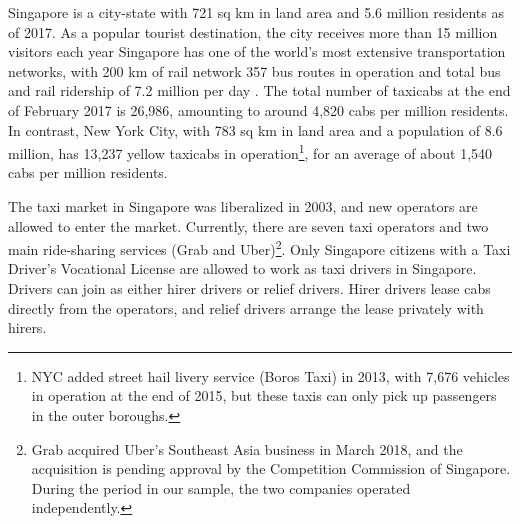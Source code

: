 \documentclass[reviewmode]{AEA}
\begin{document}
Singapore is a city-state with 721 sq km in land area and 5.6 million residents as of 2017. As a popular tourist destination, the city receives more than 15 million visitors each year
Singapore has one of the world's most extensive transportation networks, with 200 km of rail network
357 bus routes in operation
and total bus and rail ridership of 7.2 million per day%
.
The total number of taxicabs at the end of February 2017 is 26,986, amounting to around 4,820 cabs per million residents. In contrast, New York City, with 783 sq km in land area and a population of 8.6 million, has 13,237 yellow taxicabs in operation\footnote{NYC added street hail livery service (Boros Taxi) in 2013, with 7,676 vehicles in operation at the end of 2015, but these taxis can only pick up passengers in the outer boroughs.}, for an average of about 1,540 cabs per million residents.

The taxi market in Singapore was liberalized in 2003, and new operators are allowed to enter the market. Currently, there are seven taxi operators 
and two main ride-sharing services (Grab and Uber)\footnote{Grab acquired Uber's Southeast Asia business in March 2018, and the acquisition is pending approval by the Competition Commission of Singapore. During the period in our sample, the two companies operated independently.}. Only Singapore citizens with a Taxi Driver's Vocational License are allowed to work as taxi drivers in Singapore. Drivers can join as either hirer drivers or relief drivers. Hirer drivers lease cabs directly from the operators, and relief drivers arrange the lease privately with hirers.
\end{document}
